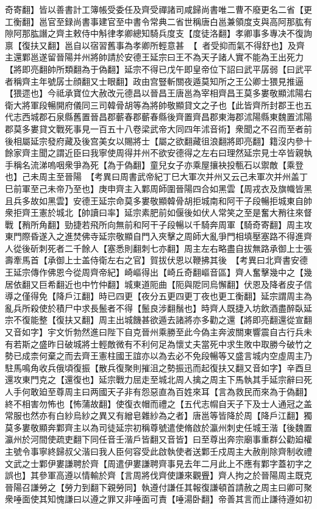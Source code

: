 奇寄翻】皆以善書計工簿帳受委任及齊受禪諸司咸歸尚書唯二曹不廢更名二省【更工衡翻】邕官至録尚書事建官至中書令常典二省世稱唐白邕兼領度支與高阿那肱有隙阿那肱譖之齊主敕侍中斛律孝卿總知騎兵度支【度徒洛翻】孝卿事多專决不復詢禀【復扶又翻】邕自以宿習舊事為孝卿所輕意甚【者受抑而氣不得舒也】及齊主還鄴邕遂留晉陽并州將帥請於安德王延宗曰王不為天子諸人實不能為王出死力【將即亮翻帥所類翻為于偽翻】延宗不得已戊午即皇帝位下詔曰武平孱弱【曰武平者稱齊主年號孱士顔翻又士眼翻】政由宫豎斬關夜遁莫知所之王公卿士猥見推逼【猥遝也】今祗承寶位大赦改元德昌以晉昌王唐邕為宰相齊昌王莫多婁敬顯沭陽右衛大將軍段暢開府儀同三司韓骨胡等為將帥敬顯貸文之子也【此皆齊所封郡王也五代志西城郡石泉縣舊置晉昌郡蘄春郡蘄春縣後齊置齊昌郡東海郡沭陽縣東魏置沭陽郡莫多婁貸文戰死事見一百五十八卷梁武帝大同四年沭音術】衆聞之不召而至者前後相屬延宗發府藏及後宫美女以賜將士【屬之欲翻藏徂浪翻將即亮翻】籍沒内參十餘家齊主聞之謂近臣曰我寧使周得并州不欲安德得之左右曰理然延宗見士卒皆親執手稱名流涕嗚咽衆爭為死【為于偽翻】童兒女子亦乘屋攘袂投甎石以禦敵【乘登也】己未周主至晉陽　【考異曰周書武帝紀丁巳大軍次并州又云己未軍次并州盖丁巳前軍至己未帝乃至也】庚申齊主入鄴周師圍晉陽四合如黑雲【周戎衣及旗幟皆黑且兵多故如黑雲】安德王延宗命莫多婁敬顯韓骨胡拒城南和阿干子段暢拒城東自帥衆拒齊王憲於城北【帥讀曰率】延宗素肥前如偃後如伏人常笑之至是奮大矟往來督戰【矟所角翻】勁捷若飛所向無前和阿干子段暢以千騎奔周軍【騎奇寄翻】周主攻東門際昏遂入之進焚佛寺延宗敬顯自門入夾擊之周師大亂爭門相填壓塞路不得進齊人從後斫刺死者二千餘人【塞悉則翻刺七亦翻】周主左右略盡自拔無路承御上士張壽牽馬首【承御上士盖侍衛左右之官】賀拔伏恩以鞭拂其後　【考異曰北齊書安德王延宗傳作佛恩今從周齊帝紀】崎嶇得出【崎丘奇翻嶇音區】齊人奮擊幾中之【幾居依翻又巨希翻近也中竹仲翻】城東道阨曲【阨與阸同烏懈翻】伏恩及降者皮子信導之僅得免【降戶江翻】時已四更【夜分五更四更丁夜也更工衡翻】延宗謂周主為亂兵所殺使於積尸中求長鬛者不得【鬛良涉翻鬚也】時齊人既捷入坊飲酒盡醉臥延宗不復能整【復扶又翻】周主出城饑甚欲遁去諸將亦多勸之還【將即亮翻還從宣翻又音如字】宇文忻勃然進曰陛下自克晉州乘勝至此今偽主奔波關東響震自古行兵未有若斯之盛昨日破城將士輕敵微有不利何足為懷丈夫當死中求生敗中取勝今破竹之勢已成柰何棄之而去齊王憲柱國王誼亦以為去必不免段暢等又盛言城内空虛周主乃駐馬鳴角收兵俄頃復振【散兵復聚則摧沮之勢振迅而起復扶又翻又音如字】辛酉旦還攻東門克之【還復也】延宗戰力屈走至城北周人擒之周主下馬執其手延宗辭曰死人手何敢廹至尊周主曰两國天子非有怨惡直為百姓來耳【言為救民而來為于偽翻】終不相害勿怖也【怖蒲故翻】使復衣帽而禮之【五代志㡌自天子下及士人通冠之盖常服也然亦有白紗烏紗之異又有繒皂雜紗為之者】唐邕等皆降於周【降戶江翻】獨莫多婁敬顯奔鄴齊主以為司徒延宗初稱尊號遣使脩啟於瀛州刺史任城王湝【後魏置瀛州於河間使疏吏翻下同任音壬湝戶皆翻又音皆】曰至尊出奔宗廟事重群公勸廹權主號令事寧終歸叔父湝曰我人臣何容受此啟執使者送鄴壬戍周主大赦削除齊制收禮文武之士鄴伊婁謙聘於齊【周遣伊婁謙聘齊事見去年二月此上不應有鄴字蓋初字之誤也】其參軍高遵以情輸於齊【言周將伐齊使謙來觀舋】齊人拘之於晉陽周主既克晉陽召謙勞之【勞力到翻下親勞同】執遵付謙任其報復謙頓首請赦之周主曰卿可聚衆唾面使其知愧謙曰以遵之罪又非唾面可責【唾湯卧翻】帝善其言而止謙待遵如初

